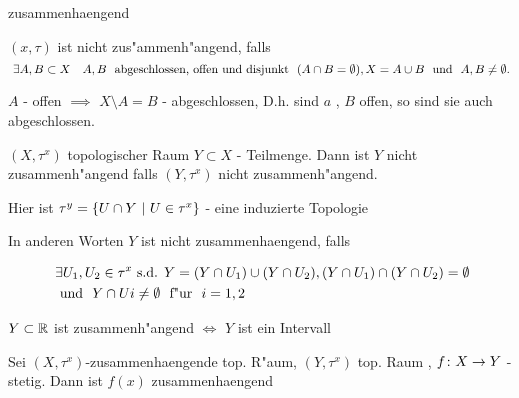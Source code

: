 \documentclass[class=article, crop=false]{standalone}
\begin{document}
\begin{zettel}{zusammenhaengend}
\begin{flashcard}
    \begin{definition}
        $(x,\tau)$ ist nicht zus"ammenh"angend, falls
\[
\exists  A,B \subset X \quad A,B  \tx{ abgeschlossen, offen und disjunkt } (A \cap B =  \emptyset), X =  A \cup B \tx{ und } A,B \neq \emptyset
.\]
\begin{remark}
$A$ - offen $\implies $ $X \setminus A =  B$ - abgeschlossen, D.h. sind $a$ , $B$ offen, so sind sie auch abgeschlossen.
\end{remark}
    \end{definition}
\end{flashcard}
\begin{definition}
    $(X,\tau^x)$ topologischer Raum $Y \subset X$ - Teilmenge. Dann ist $Y$ nicht zusammenh"angend falls $ (Y,\tau^x)$ nicht zusammenh"angend.

    Hier ist $\tau^y =  \set{U \cap Y}{U \in  \tau^x}$ - eine induzierte Topologie

    In anderen Worten $Y$ ist nicht zusammenhaengend, falls

    \begin{align*}
    &\exists U_1 , U_2 \in  \tau^x \text{ s.d. } Y = ( Y \cap U_1 ) \cup ( Y \cap U_2), ( Y \cap U_1 ) \cap ( Y \cap U_2) = \emptyset \\
    &\tx{ und } Y \cap Ui \neq  \emptyset \tx{ f"ur } i = 1,2
    \end{align*}
\end{definition}
\end{zettel}

\begin{lemma}
$Y \subset \mathbb{R} $ ist zusammenh"angend $\iff $ $Y$ ist ein Intervall
\end{lemma}

\begin{theorem}
Sei $(X,\tau^x)$-zusammenhaengende top. R"aum, $ (Y,\tau^x)$ top. Raum , $f \colon X\to Y $ - stetig. Dann ist $f(x)$ zusammenhaengend
\end{theorem}
\end{document}
